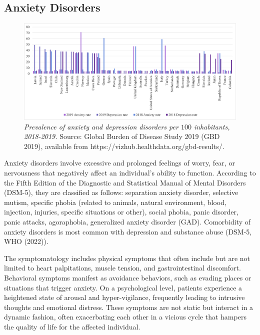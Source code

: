        \subsection{Anxiety Disorders}

            \begin{figure}  %
                \centering
                \includegraphics[width=\textwidth]{GRAPHS/anxiety_depression_100_rate_2018_2019.png}
                \caption{\emph{Prevalence of anxiety and depression disorders per $100$ inhabitants, 2018-2019.}
                {\scriptsize Source: Global Burden of Disease Study 2019 (GBD 2019), available from https://vizhub.healthdata.org/gbd-results/.}}
                \label{fig:anxiety_OECD}
            \end{figure}
            
            Anxiety disorders involve excessive and prolonged feelings of worry, fear, or nervousness that negatively affect an individual's ability to function. According to the Fifth Edition of the Diagnostic and Statistical Manual of Mental Disorders (DSM-5), they are classified as follows: separation anxiety disorder, selective mutism, specific phobia (related to animals, natural environment, blood, injection, injuries, specific situations or other), social phobia, panic disorder, panic attacks, agoraphobia, generalized anxiety disorder (GAD). Comorbidity of anxiety disorders is most common with depression and substance abuse (DSM-5, WHO (2022)).

            The symptomatology includes physical symptoms that often include but are not limited to heart palpitations, muscle tension, and gastrointestinal discomfort. Behavioral symptoms manifest as avoidance behaviors, such as evading places or situations that trigger anxiety. On a psychological level, patients experience a heightened state of arousal and hyper-vigilance, frequently leading to intrusive thoughts and emotional distress. These symptoms are not static but interact in a dynamic fashion, often exacerbating each other in a vicious cycle that hampers the quality of life for the affected individual.


